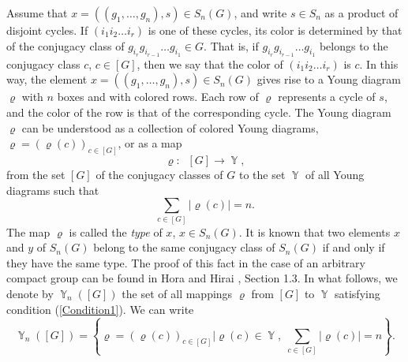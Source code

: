 \documentclass[12pt]{amsart}
\theoremstyle{definition}
\numberwithin{equation}{section}
\DeclareMathOperator{\Y}{\mathbb{Y}}
\begin{document}
Assume that $x=\left(\left(g_1,\ldots,g_n\right),s\right)\in S_n\left(G\right)$, and write $s\in S_n$ as a product of disjoint cycles. If $\left(i_1i_2\ldots i_r\right)$ is one of these cycles,
its color is determined by that of the conjugacy class of $g_{i_r}g_{i_{r-1}}\ldots g_{i_1}\in G$.
That is, if $g_{i_r}g_{i_{r-1}}\ldots g_{i_1}$ belongs to the conjugacy class $c$, $c\in\left[G\right]$,
then we say that the color of $\left(i_1i_2\ldots i_r\right)$ is $c$.
In this way, the element
$x=\left(\left(g_1,\ldots,g_n\right),s\right)\in S_n\left(G\right)$ gives rise to a Young diagram $\varrho$ with $n$ boxes and with colored rows. Each row of $\varrho$ represents a cycle of $s$, and the color of the row is that of the corresponding cycle.
The Young diagram $\varrho$ can be understood as a collection of colored Young diagrams,
$\varrho=\left(\varrho(c)\right)_{c\in\left[G\right]}$, or as a map
$$
\varrho:\;\; \left[G\right]\longrightarrow \Y,
$$
from the set $\left[G\right]$ of the conjugacy classes of $G$ to the set $\Y$ of all Young diagrams such that
\begin{equation}\label{Condition1}
\sum\limits_{c\in\left[G\right]}\left|\varrho(c)\right|=n.
\end{equation}
The map $\varrho$ is called the \textit{type} of $x$, $x\in S_n\left(G\right)$. It is known that two elements
$x$ and $y$ of $S_n\left(G\right)$ belong to the same conjugacy class of $S_n\left(G\right)$
if and only if they have the same type. The proof of this fact in the case
of an arbitrary compact group can be found in Hora and Hirai \cite{HoraHirai}, Section 1.3.
In what follows, we denote by $\Y_n\left(\left[G\right]\right)$ the set of all
mappings $\varrho$ from $\left[G\right]$ to $\Y$ satisfying condition (\ref{Condition1}).
We can write
\begin{equation}\label{Yn[G]}
\Y_n\left(\left[G\right]\right)
=\left\{\varrho=\left(\varrho(c)\right)_{c\in \left[G\right]}
\biggl|\varrho(c)\in\Y,\;\sum\limits_{c\in\left[G\right]}|\varrho(c)|=n\right\}.
\end{equation}
\end{document}
